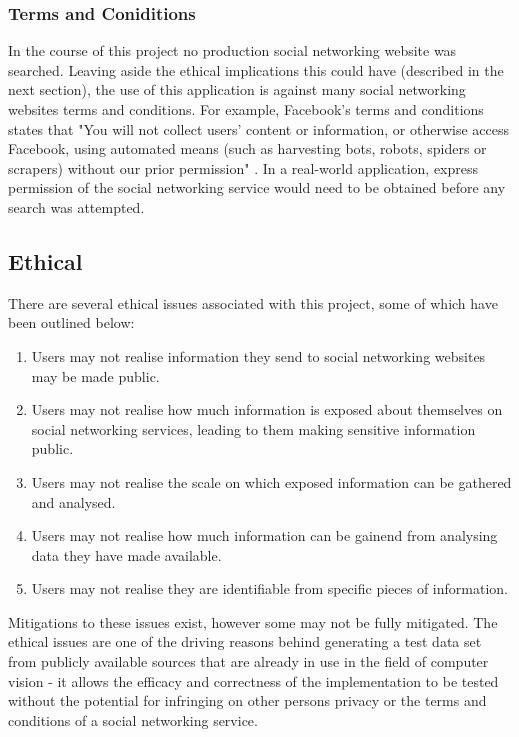 \documentclass[12pt]{article}
\begin{document}
\subsubsection{Terms and Coniditions}
In the course of this project no production social networking website was searched. Leaving aside the ethical implications this could have (described in the next section), the use of this application is against many social networking websites terms and conditions. For example, Facebook's terms and conditions states that "You will not collect users' content or information, or otherwise access Facebook, using automated means (such as harvesting bots, robots, spiders or scrapers) without our prior permission" \citep{facebooktermsconditions}. In a real-world application, express permission of the social networking service would need to be obtained before any search was attempted.

\subsection{Ethical}
There are several ethical issues associated with this project, some of which have been outlined below:

\begin{enumerate}
\item{Users may not realise information they send to social networking websites may be made public.}
\item{Users may not realise how much information is exposed about themselves on social networking services, leading to them making sensitive information public.}
\item{Users may not realise the scale on which exposed information can be gathered and analysed.}
\item{Users may not realise how much information can be gainend from analysing data they have made available.}
\item{Users may not realise they are identifiable from specific pieces of information.}
\end{enumerate}

Mitigations to these issues exist, however some may not be fully mitigated. The ethical issues are one of the driving reasons behind generating a test data set from publicly available sources that are already in use in the field of computer vision - it allows the efficacy and correctness of the implementation to be tested without the potential for infringing on other persons privacy or the terms and conditions of a social networking service.
\end{document}
